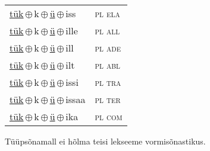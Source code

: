 \begin{minipage}{\textwidth}
\begin{sideways}
\begin{tabular}{l l}
\underline{tük}\,$\oplus$\,k\,$\oplus$\,\underline{ü}\,$\oplus$\,iss & \textsc{ pl ela } \\
\underline{tük}\,$\oplus$\,k\,$\oplus$\,\underline{ü}\,$\oplus$\,ille & \textsc{ pl all } \\
\underline{tük}\,$\oplus$\,k\,$\oplus$\,\underline{ü}\,$\oplus$\,ill & \textsc{ pl ade } \\
\underline{tük}\,$\oplus$\,k\,$\oplus$\,\underline{ü}\,$\oplus$\,ilt & \textsc{ pl abl } \\
\underline{tük}\,$\oplus$\,k\,$\oplus$\,\underline{ü}\,$\oplus$\,issi & \textsc{ pl tra } \\
\underline{tük}\,$\oplus$\,k\,$\oplus$\,\underline{ü}\,$\oplus$\,issaa & \textsc{ pl ter } \\
\underline{tük}\,$\oplus$\,k\,$\oplus$\,\underline{ü}\,$\oplus$\,ika & \textsc{ pl com } \\
\end{tabular}
\end{sideways}
\label{tab:tüüpsõnamall-tükkü}

\end{minipage}

 
\vspace{1em}
\noindent Tüüpsõnamall  ei hõlma teisi lekseeme vormi\-sõnastikus.
